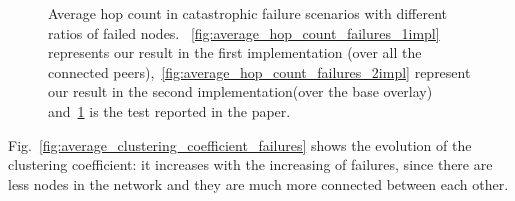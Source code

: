 \begin{figure}
\begin{subfigure}{.5\textwidth}
  \caption{}
  \label{fig:paper_average_hop_count_failures}
\end{subfigure}
\caption{Average hop count in catastrophic failure scenarios with different ratios of failed nodes. ~\ref{fig:average_hop_count_failures_1impl} represents our result in the first implementation (\getMetropolisHastingsNeighbour over all the connected peers),~\ref{fig:average_hop_count_failures_2impl} represent our result in the second implementation(\getMetropolisHastingsNeighbour over the base overlay) and~\ref{fig:paper_average_hop_count_failures} is the test reported in the paper.}
\label{fig:robustness_hop_count_failures}
\end{figure}

Fig.~\ref{fig:average_clustering_coefficient_failures} shows the evolution of the clustering coefficient: it increases with the increasing of failures, since there are less nodes in the network and they are much more connected between each other. 

